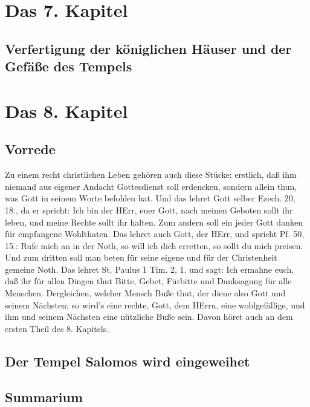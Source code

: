 \chapter{Das 7. Kapitel}

\section[Verfertigung der königlichen Häuser und der Gefäße des]{Verfertigung der königlichen Häuser und der Gefäße des Tempels}

\chapter{Das 8. Kapitel}

\section{Vorrede}

Zu einem recht christlichen Leben gehören auch diese Stücke: erstlich, daß ihm niemand aus eigener Andacht Gottesdienst soll erdencken, sondern allein thun, was Gott in seinem Worte befohlen hat. Und das lehret Gott selber Ezech. 20, 18., da er spricht: Ich bin der HErr, euer Gott, nach meinen Geboten sollt ihr leben, und meine Rechte sollt ihr halten. Zum andern soll
ein jeder Gott danken für empfangene Wohlthaten. Das lehret auch Gott, der HErr, und spricht Pf. 50, 15.: Rufe mich an in der Noth, so will ich dich erretten, so sollt du mich preisen. Und zum dritten soll man beten für seine eigene und für der Christenheit gemeine Noth. Das lehret St. Paulus 1 Tim. 2, 1. und sagt: Ich ermahne euch, daß ihr für allen Dingen thut Bitte, Gebet, Fürbitte und Danksagung für alle Menschen. Dergleichen, welcher Mensch Buße thut, der diene also Gott und seinem Nächsten; so wird’s eine rechte, Gott, dem HErrn, eine wohlgefällige, und ihm und seinem Nächsten eine nützliche Buße sein. Davon höret auch an dem ersten Theil des 8. Kapitels.

\section{Der Tempel Salomos wird eingeweihet}



\section{Summarium}

